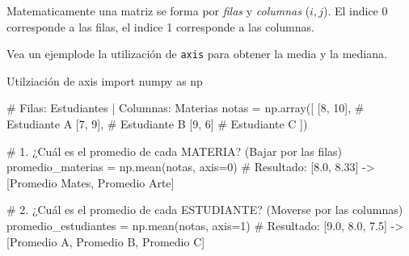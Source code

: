 Matematicamente una matriz se forma por \textit{filas} y \textit{columnas} (\(i,j\)). El indice 0 corresponde a las filas, el indice 1 corresponde a las columnas.

Vea un ejemplode la utilización de \texttt{axis} para obtener la media y la mediana.
\begin{pycode}{Utilziación de axis}
import numpy as np

# Filas: Estudiantes | Columnas: Materias 
notas = np.array([
    [8, 10], # Estudiante A
    [7, 9],  # Estudiante B
    [9, 6]   # Estudiante C
])

# 1. ¿Cuál es el promedio de cada MATERIA? (Bajar por las filas)
promedio_materias = np.mean(notas, axis=0) 
# Resultado: [8.0, 8.33] -> [Promedio Mates, Promedio Arte]

# 2. ¿Cuál es el promedio de cada ESTUDIANTE? (Moverse por las columnas)
promedio_estudiantes = np.mean(notas, axis=1)
# Resultado: [9.0, 8.0, 7.5] -> [Promedio A, Promedio B, Promedio C]
\end{pycode}